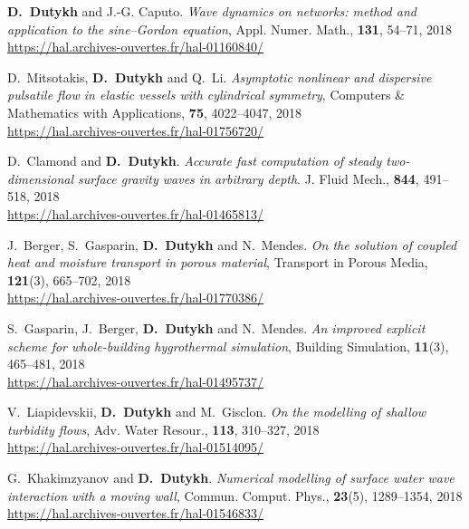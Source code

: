 \begin{etaremune}
  \item \textbf{D.~Dutykh} and J.-G. Caputo. \textit{Wave dynamics on networks: method and application to the sine--Gordon equation}, Appl. Numer. Math., \textbf{131}, 54--71, 2018 \\ %
  \url{https://hal.archives-ouvertes.fr/hal-01160840/}
  
  \item D.~Mitsotakis, \textbf{D.~Dutykh} and Q.~Li. \textit{Asymptotic nonlinear and dispersive pulsatile flow in elastic vessels with cylindrical symmetry}, Computers \& Mathematics with Applications, \textbf{75}, 4022--4047, 2018 \\ %
  \url{https://hal.archives-ouvertes.fr/hal-01756720/}

  \item D.~Clamond and \textbf{D.~Dutykh}. \textit{Accurate fast computation of steady two-dimensional surface gravity waves in arbitrary depth}. J. Fluid Mech., \textbf{844}, 491--518, 2018 \\ %
  \url{https://hal.archives-ouvertes.fr/hal-01465813/}

  \item J.~Berger, S.~Gasparin, \textbf{D.~Dutykh} and N.~Mendes. \textit{On the solution of coupled heat and moisture transport in porous material}, Transport in Porous Media, \textbf{121}(3), 665--702, 2018 \\ %
  \url{https://hal.archives-ouvertes.fr/hal-01770386/}

  \item S.~Gasparin, J.~Berger, \textbf{D.~Dutykh} and N.~Mendes. \textit{An improved explicit scheme for whole-building hygrothermal simulation}, Building Simulation, \textbf{11}(3), 465--481, 2018 \\ %
  \url{https://hal.archives-ouvertes.fr/hal-01495737/}
  
  \item V.~Liapidevskii, \textbf{D.~Dutykh} and M.~Gisclon. \textit{On the modelling of shallow turbidity flows}, Adv. Water Resour., \textbf{113}, 310--327, 2018 \\ %
  \url{https://hal.archives-ouvertes.fr/hal-01514095/}

  \item G.~Khakimzyanov and \textbf{D.~Dutykh}. \textit{Numerical modelling of surface water wave interaction with a moving wall}, Commun. Comput. Phys., \textbf{23}(5), 1289--1354, 2018 \\ %
  \url{https://hal.archives-ouvertes.fr/hal-01546833/}


\end{etaremune}
